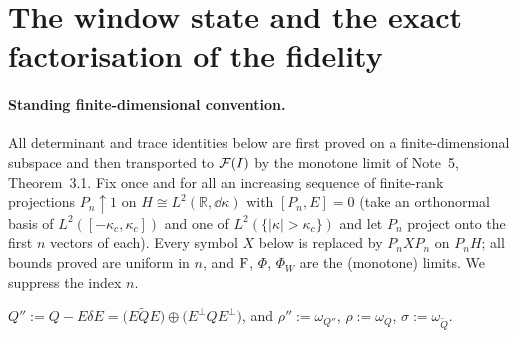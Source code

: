 \documentclass[11pt]{article}
\begin{document}
\section{The window state and the exact factorisation of the fidelity}\label{sec:window}

\paragraph{Standing finite-dimensional convention.}  All determinant and trace identities below are
first proved on a finite-dimensional subspace and then transported to $\mathcal F(I)$ by the monotone limit
of Note~5, Theorem~3.1.  Fix once and for all an increasing sequence of finite-rank projections
$P_n\uparrow1$ on $H\cong L^2(\mathbb R,\dd\kappa)$ with $[P_n,E]=0$ (take an orthonormal basis of
$L^2([-\kappa_c,\kappa_c])$ and one of $L^2(\{|\kappa|>\kappa_c\})$ and let $P_n$ project onto the
first $n$ vectors of each).  Every symbol $X$ below is replaced by $P_nXP_n$ on $P_nH$; all bounds
proved are uniform in $n$, and $\operatorname{F}$, $\Phi$, $\Phi_W$ are the (monotone) limits.  We suppress the
index $n$.

\begin{definition}\label{def:Qpp}
$\displaystyle Q'':=Q-E\delta E=\bigl(E\widetilde QE\bigr)\oplus\bigl(E^\perp QE^\perp\bigr)$,
and $\rho'':=\omega_{Q''}$, $\rho:=\omega_Q$, $\sigma:=\omega_{\widetilde Q}$.
\end{definition}
\end{document}
